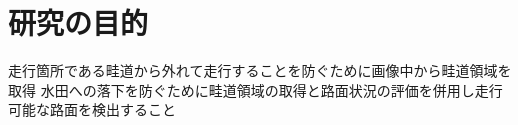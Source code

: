 \section{研究の目的}
走行箇所である畦道から外れて走行することを防ぐために画像中から畦道領域を取得
水田への落下を防ぐために畦道領域の取得と路面状況の評価を併用し走行可能な路面を検出すること


%
